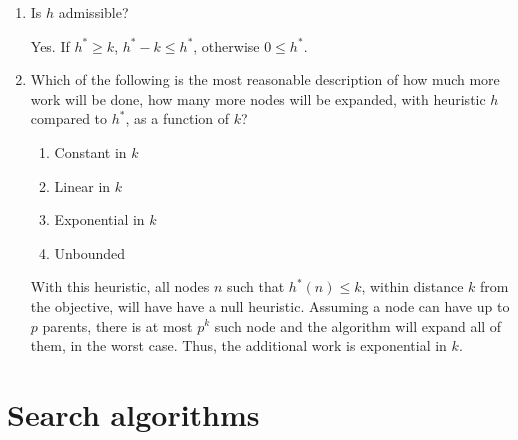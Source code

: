 \documentclass[11pt, a4paper]{article}
\begin{document}
\begin{enumerate}
    \item Is $h$ admissible?

    \begin{solution}
        Yes. If $h^* \geq k$, $h^* - k \leq h^*$, otherwise $0 \leq h^*$.
    \end{solution}

    \item Which of the following is the most reasonable description of how much more work will be done, \ie{} how many more nodes will be expanded, with heuristic $h$ compared to $h^*$, as a function of $k$?

    \begin{enumerate}
        \item Constant in $k$
        \item Linear in $k$
        \item Exponential in $k$
        \item Unbounded
    \end{enumerate}

    \begin{solution}
        With this heuristic, all nodes $n$ such that $h^*(n) \leq k$, \ie{} within distance $k$ from the objective, will have have a null heuristic. Assuming a node can have up to $p$ parents, there is at most $p^k$ such node and the algorithm will expand all of them, in the worst case. Thus, the additional work is exponential in $k$.
    \end{solution}
\end{enumerate}

\newpage

\section{Search algorithms}

\begin{figure}[h]
    \centering
\end{figure}
\end{document}
